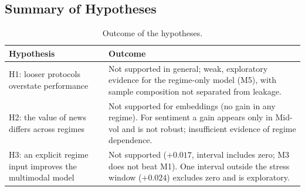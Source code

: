 \subsection{Summary of Hypotheses}
\begin{table}[H]
\centering
\begin{tabular}{p{5.2cm}p{9.3cm}}
\toprule
Hypothesis & Outcome\\
\midrule
H1: looser protocols overstate performance & Not supported in general; weak, exploratory evidence for the regime-only model (M5), with sample composition not separated from leakage.\\
H2: the value of news differs across regimes & Not supported for embeddings (no gain in any regime). For sentiment a gain appears only in Mid-vol and is not robust; insufficient evidence of regime dependence.\\
H3: an explicit regime input improves the multimodal model & Not supported ($+0.017$, interval includes zero; M3 does not beat M1). One interval outside the stress window ($+0.024$) excludes zero and is exploratory.\\
\bottomrule
\end{tabular}
\caption{Outcome of the hypotheses.}
\end{table}
